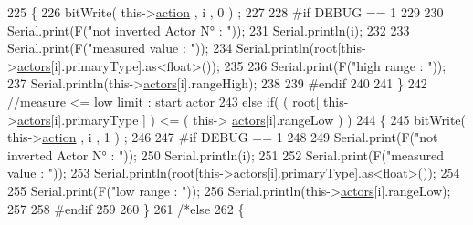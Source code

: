 \begin{DoxyCode}
225                         \{   
226                             bitWrite( this->\hyperlink{class_jetpack_aca3142925a7b0834b34ae91d26af7765}{action} , i , 0 ) ;    
227 
228 \textcolor{preprocessor}{                        #if DEBUG == 1}
229                             
230                             Serial.print(F(\textcolor{stringliteral}{"not inverted Actor N° : "}));
231                             Serial.println(i);
232 
233                             Serial.print(F(\textcolor{stringliteral}{"measured value : "}));
234                             Serial.println(root[this->\hyperlink{class_jetpack_a7e16d2f97837f9712a2e6de1c50d99db}{actors}[i].primaryType].as<float>());
235 
236                             Serial.print(F(\textcolor{stringliteral}{"high range : "}));
237                             Serial.println(this->\hyperlink{class_jetpack_a7e16d2f97837f9712a2e6de1c50d99db}{actors}[i].rangeHigh);
238                         
239 \textcolor{preprocessor}{                        #endif}
240                         
241                         \}
242                         \textcolor{comment}{//measure <= low limit : start actor}
243                         \textcolor{keywordflow}{else} \textcolor{keywordflow}{if}( ( root[ this->\hyperlink{class_jetpack_a7e16d2f97837f9712a2e6de1c50d99db}{actors}[i].primaryType ] ) <= ( this->
      \hyperlink{class_jetpack_a7e16d2f97837f9712a2e6de1c50d99db}{actors}[i].rangeLow ) )
244                         \{
245                             bitWrite( this->\hyperlink{class_jetpack_aca3142925a7b0834b34ae91d26af7765}{action} , i , 1 ) ;
246 
247 \textcolor{preprocessor}{                        #if DEBUG == 1}
248 
249                             Serial.print(F(\textcolor{stringliteral}{"not inverted Actor N° : "}));
250                             Serial.println(i);
251 
252                             Serial.print(F(\textcolor{stringliteral}{"measured value : "}));
253                             Serial.println(root[this->\hyperlink{class_jetpack_a7e16d2f97837f9712a2e6de1c50d99db}{actors}[i].primaryType].as<float>());
254 
255                             Serial.print(F(\textcolor{stringliteral}{"low range : "}));
256                             Serial.println(this->\hyperlink{class_jetpack_a7e16d2f97837f9712a2e6de1c50d99db}{actors}[i].rangeLow);
257                         
258 \textcolor{preprocessor}{                        #endif}
259                                             
260                         \}
261                         \textcolor{comment}{/*else }
262 \textcolor{comment}{                        \{}

\end{DoxyCode}
